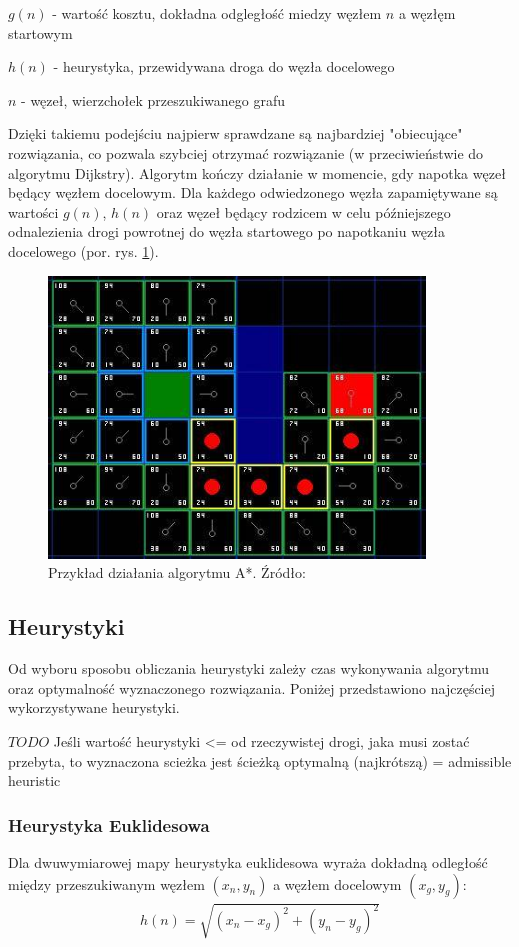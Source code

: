  $g(n)$ - wartość kosztu, dokładna odgległość miedzy węzłem $n$ a węzłęm startowym

 $h(n)$ - heurystyka, przewidywana droga do węzła docelowego

 $n$ - węzeł, wierzchołek przeszukiwanego grafu

Dzięki takiemu podejściu najpierw sprawdzane są najbardziej "obiecujące" rozwiązania, co pozwala szybciej otrzymać rozwiązanie (w przeciwieństwie do algorytmu Dijkstry).
Algorytm kończy działanie w momencie, gdy napotka węzeł będący węzłem docelowym.
Dla każdego odwiedzonego węzła zapamiętywane są wartości $g(n)$, $h(n)$ oraz węzeł będący rodzicem w celu późniejszego odnalezienia drogi powrotnej do węzła startowego po napotkaniu węzła docelowego (por. rys. \ref{fig:image_astar2}).

\begin{figure}[H]
	\centering
	\includegraphics[width=10cm]{img/astar-t7}
	\caption{Przykład działania algorytmu A*. Źródło: \cite{astar2}}
	\label{fig:image_astar2}
\end{figure}

\subsection{Heurystyki}
Od wyboru sposobu obliczania heurystyki zależy czas wykonywania algorytmu oraz optymalność wyznaczonego rozwiązania.
Poniżej przedstawiono najczęściej wykorzystywane heurystyki.

$TODO$ Jeśli wartość heurystyki <= od rzeczywistej drogi, jaka musi zostać przebyta, to wyznaczona scieżka jest ścieżką optymalną (najkrótszą)
= admissible heuristic

\subsubsection{Heurystyka Euklidesowa}
Dla dwuwymiarowej mapy heurystyka euklidesowa wyraża dokładną odległość między przeszukiwanym węzłem $(x_n, y_n)$ a węzłem docelowym $(x_g, y_g)$:
\begin{gather}
 	h(n) = \sqrt{(x_n - x_g)^2 + (y_n - y_g)^2}
 	\label{eq_astar_heu_euc} 
\end{gather}

